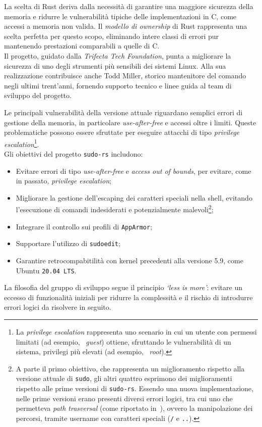 La scelta di Rust deriva dalla necessità di garantire una maggiore sicurezza della memoria e ridurre le vulnerabilità
tipiche delle implementazioni in C, come accessi a memoria non valida. Il \textit{modello di ownership} di Rust 
rappresenta una scelta perfetta per questo scopo, eliminando intere classi di errori pur mantenendo prestazioni comparabili a quelle di C. \hfill
\vspace{10pt}\\
\noindent Il progetto, guidato dalla \textit{Trifecta Tech Foundation}, punta a migliorare la sicurezza di uno degli strumenti più sensibili dei sistemi Linux.
Alla sua realizzazione contribuisce anche Todd Miller, storico mantenitore del comando negli ultimi trent'anni, fornendo supporto tecnico e linee guida 
al team di sviluppo del progetto.

Le principali vulnerabilità della versione attuale riguardano semplici errori di gestione della memoria, in particolare 
\textit{use-after-free} e accessi oltre i limiti.
Queste problematiche possono essere sfruttate per eseguire attacchi di tipo \textit{privilege escalation}\footnote{La \textit{privilege escalation} rappresenta uno scenario in cui 
un utente con permessi limitati (ad esempio, \ \textit{guest}) ottiene, sfruttando le vulnerabilità di un sistema, privilegi più elevati (ad esempio, \ \textit{root}).}. \hfill
\vspace{10pt} \\
\noindent Gli obiettivi del progetto \texttt{sudo-rs} includono:
\begin{itemize}
    \item Evitare errori di tipo \textit{use-after-free} e \textit{access out of bounds}, per evitare, come in passato, \textit{privilege escalation};
    \item Migliorare la gestione dell'escaping dei caratteri speciali nella shell, evitando l'esecuzione di comandi indesiderati e potenzialmente malevoli\footnote{A parte il primo obiettivo, che rappresenta un miglioramento rispetto alla versione attuale di \texttt{sudo}, gli altri quattro esprimono dei miglioramenti rispetto alle prime versioni di \texttt{sudo-rs}. Essendo una nuova implementazione, nelle prime versioni erano presenti diversi errori logici, tra cui uno che permetteva \textit{path trasversal} (come riportato in~\cite{cve}), ovvero la manipolazione dei percorsi, tramite username con caratteri speciali (\texttt{/} e \texttt{..}).};
    \item Integrare il controllo sui profili di \texttt{AppArmor};
    \item Supportare l'utilizzo di \texttt{sudoedit};
    \item Garantire retrocompabitilità con kernel precedenti alla versione 5.9, come Ubuntu \texttt{20.04 LTS}.\ 
\end{itemize}
La filosofia del gruppo di sviluppo segue il principio \textit{`less is more'}: evitare un eccesso di funzionalità iniziali per ridurre la complessità e il rischio di
introdurre errori logici da risolvere in seguito.

